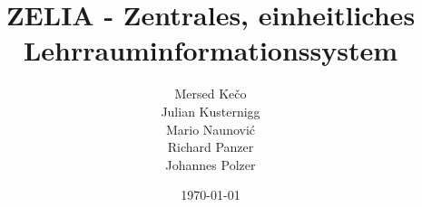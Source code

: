 \title{ZELIA - Zentrales, einheitliches Lehrrauminformationssystem }
\author{Mersed Kečo \\
Julian Kusternigg \\
Mario Naunović \\
Richard Panzer \\
Johannes Polzer 
}
\date{\today}